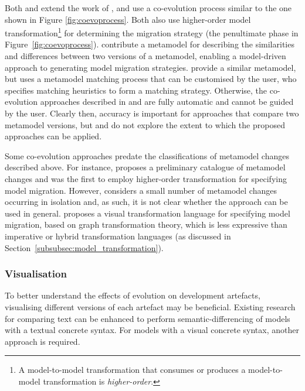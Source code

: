 Both \cite{cicchetti08automating} and \cite{garces09managing} extend the work of \cite{gruschko07towards}, and use a co-evolution process similar to the one shown in Figure \ref{fig:coevoprocess}. Both also use higher-order model transformation\footnote{A model-to-model transformation that consumes or produces a model-to-model transformation is \emph{higher-order}.} for determining the migration strategy (the penultimate phase in Figure~\ref{fig:coevoprocess}). \cite{cicchetti08automating} contribute a metamodel for  describing the similarities and differences between two versions of a metamodel, enabling a model-driven approach to generating model migration strategies. \cite{garces09managing} provide a similar metamodel, but uses a metamodel matching process that can be customised by the user, who specifies matching heuristics to form a matching strategy. Otherwise, the co-evolution approaches described in \cite{cicchetti08automating} and \cite{garces09managing} are fully automatic and cannot be guided by the user. Clearly then, accuracy is important for approaches that compare two metamodel versions, but \cite{cicchetti08automating} and \cite{garces09managing} do not explore the extent to which the proposed approaches can be applied.

Some co-evolution approaches predate the classifications of metamodel changes described above. For instance, \cite{wachsmuth07metamodel} proposes a preliminary catalogue of metamodel changes and was the first to employ higher-order transformation for specifying model migration. However, \cite{wachsmuth07metamodel} considers a small number of metamodel changes occurring in isolation and, as such, it is not clear whether the approach can be used in general. \cite{sprinkle03thesis} proposes a visual transformation language for specifying model migration, based on graph transformation theory, which is less expressive than imperative or hybrid transformation languages (as discussed in Section~\ref{subsubsec:model_transformation}).

\subsubsection{Visualisation}
To better understand the effects of evolution on development artefacts, visualising different versions of each artefact may be beneficial. Existing research for comparing text can be enhanced to perform semantic-differencing of models with a textual concrete syntax. For models with a visual concrete syntax, another approach is required. 

